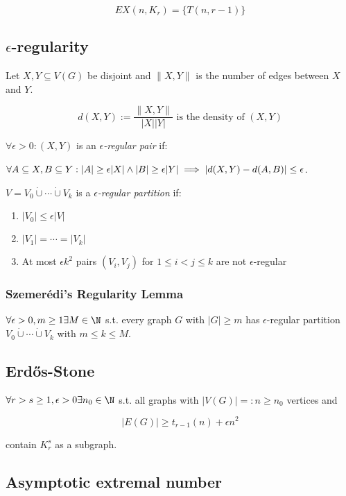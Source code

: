 $$EX(n,K_r) = \{T(n,r-1)\}$$

\subsection*{$\epsilon$-regularity}

Let $X, Y \subseteq V(G)$ be disjoint and $\|X,Y\|$ is the number of edges between $X$ and $Y$.

$$d(X,Y) := \frac{\|X,Y\|}{|X||Y|} \text{ is the density of $(X, Y)$}$$

$\forall \epsilon > 0 : (X,Y)$ is an \emph{$\epsilon$-regular pair} if:

$\forall A \subseteq X, B \subseteq Y : \\ |A| \geq \epsilon|X| \land |B| \geq \epsilon|Y| \implies |d(X,Y) - d(A,B)| \leq \epsilon$.

\spacing

$V=V_0 \dot\cup\cdots\dot\cup V_k$ is a \emph{$\epsilon$-regular partition} if:

\begin{enumerate}
	\item $|V_0| \leq \epsilon|V|$
	\item $|V_1| = \cdots = |V_k|$
	\item At most $\epsilon k^2$ pairs $(V_i,V_j)$ for $1 \leq i < j \leq k$ are not $\epsilon$-regular
\end{enumerate}

\subsubsection*{Szemer\'{e}di's Regularity Lemma}

$\forall \epsilon > 0, m \geq 1 \exists M \in \N$ s.t. every graph $G$ with $|G| \geq m$ has $\epsilon$-regular partition $V_0 \dot\cup\cdots\dot\cup V_k$ with $m \leq k \leq M$.

\subsection*{Erd\H{o}s-Stone}

$\forall r > s \geq 1, \epsilon > 0 \exists n_0 \in \N$ s.t. all graphs with $|V(G)| =: n \geq n_0$ vertices and

\vspace*{-2mm}
$$|E(G)| \geq t_{r-1}(n)+\epsilon n^2$$

contain $K_r^s$ as a subgraph.

\subsection*{Asymptotic extremal number}

